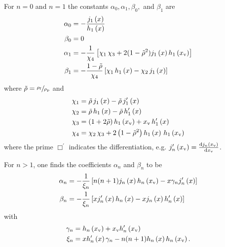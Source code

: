 For $n=0$ and $n=1$ the constants $\alpha_{0}, \alpha_{1}, \beta_{0},$ and 
$\beta_{1}$ are
\begin{subequations}
\begin{align}
  \alpha_{0} & = -\frac{j_{1}\left(x\right)}{h_{1}\left(x\right)} \\
  \beta_{0} & = 0 \\
  \alpha_{1} & = - \frac{1}{\chi_{4}} \left[ \chi_{1}\,\chi_{3} + 
  2(1-\tilde{\rho}^{2})j_{1}\left(x\right)h_{1}\left(x_{\mathrm{v}}\right) \right]
    \label{eq:TA-alpha-one}\\
    \beta_{1} &= - \frac{1-\tilde{\rho}}{\chi_{4}} \left[ \chi_{1}\,h_{1}\left(x\right) - 
    \chi_{2}\,j_{1}\left(x\right) \right]
    \label{eq:TA-beta-one}
\end{align}
\end{subequations}
where $\tilde{\rho} = \sfrac{\rho_{\mathrm{f}}}{\rho_{\mathrm{p}}}$ and
\begin{subequations}
\begin{align}
\chi_{1} & = \tilde{\rho}\,j_{1}\left(x\right) - \tilde{\rho}\,j^{\prime}_{1}\left(x\right)
\label{eq:TA-chi-one} \\
\chi_{2} & = \tilde{\rho}\,h_{1}\left(x\right) - \tilde{\rho}\,h^{\prime}_{1}\left(x\right)
\label{eq:TA-chi-two} \\
\chi_{3} & = \left( 1 + 2 \tilde{\rho}\right)h_{1}\left(x_{\mathrm{v}}\right) + 
x_{\mathrm{v}}\,h^{\prime}_{1}\left(x\right)
\label{eq:TA-chi-three} \\
\chi_{4} & = \chi_{2}\,\chi_{3} + 2\left( 1 - \tilde{\rho}^{2} \right) 
h_{1}\left(x\right)\,h_{1}\left(x_{\mathrm{v}}\right)
\label{eq:TA-chi-four}
\end{align}
\end{subequations}
where the prime $\Box^{\prime}$ indicates the differentiation, e.g. 
$j^{\prime}_{n}\left(x_{\mathrm{v}}\right)=\dv{j_{n}\left(x_{\mathrm{v}}\right)}{x_{\mathrm{v}}}$.

For $n > 1$, one finds the coefficients $\alpha_{n}$ and $\beta_{n}$ to be
\begin{subequations}
\begin{align}
  \alpha_{n} & =
  - \frac{1}{\xi_{n}} \left[
    n(n+1)j_{n}\left(x\right)h_{n}\left(x_{\mathrm{v}}\right) - x \gamma_{n}j^{\prime}_{n}\left(x\right)
  \right]
  \label{eq:TA-alpha-n}\\
    \beta_{n} &= - \frac{1}{\xi_{n}} \left[
      xj^{\prime}_{n}\left(x\right)h_{n}\left(x\right) - xj_{n}\left(x\right)h^{\prime}_{n}\left(x\right)
    \right]
    \label{eq:TA-beta-n}
\end{align}
\end{subequations}
with
\begin{subequations}
\begin{align}
  \gamma_{n} & =
  h_{n}\left(x_{\mathrm{v}}\right)+x_{\mathrm{v}}h^{\prime}_{n}\left(x_{\mathrm{v}}\right)
  \label{eq:TA-gamma-n}\\
  \xi_{n} &= xh^{\prime}_{n}\left(x\right)\gamma_{n} - n(n+1)h_{n}\left(x\right)h_{n}\left(x_{\mathrm{v}}\right).
    \label{eq:TA-xi-n}
\end{align}
\end{subequations}

